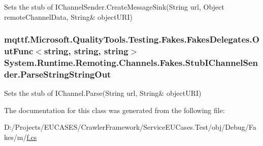 Sets the stub of I\-Channel\-Sender.\-Create\-Message\-Sink(String url, Object remote\-Channel\-Data, String\& object\-U\-R\-I)

\hypertarget{class_system_1_1_runtime_1_1_remoting_1_1_channels_1_1_fakes_1_1_stub_i_channel_sender_a788721e116196a276438159a9a7f3d4e}{
\subsubsection[{Parse\-String\-String\-Out}]{\setlength{\rightskip}{0pt plus 5cm}mqttf.\-Microsoft.\-Quality\-Tools.\-Testing.\-Fakes.\-Fakes\-Delegates.\-Out\-Func$<$string, string, string$>$ System.\-Runtime.\-Remoting.\-Channels.\-Fakes.\-Stub\-I\-Channel\-Sender.\-Parse\-String\-String\-Out}}\label{class_system_1_1_runtime_1_1_remoting_1_1_channels_1_1_fakes_1_1_stub_i_channel_sender_a788721e116196a276438159a9a7f3d4e}


Sets the stub of I\-Channel.\-Parse(String url, String\& object\-U\-R\-I)



The documentation for this class was generated from the following file\-:\begin{DoxyCompactItemize}
\item 
D\-:/\-Projects/\-E\-U\-C\-A\-S\-E\-S/\-Crawler\-Framework/\-Service\-E\-U\-Cases.\-Test/obj/\-Debug/\-Fakes/m/\hyperlink{m_2f_8cs}{f.\-cs}\end{DoxyCompactItemize}
